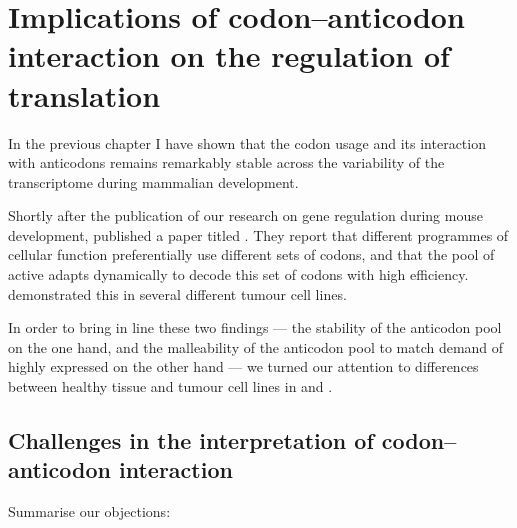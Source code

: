 \chapter{Implications of codon–anticodon interaction on the regulation of translation}

In the previous chapter I have shown that the codon usage and its interaction
with \trna anticodons remains remarkably stable across the variability of the
transcriptome during mammalian development.

Shortly after the publication of our research on \trna gene regulation during
mouse development, \citet{Gingold:2014} published a paper titled . They report that different programmes of cellular function
preferentially use different sets of codons, and that the pool of active
\trna[s] adapts dynamically to decode this set of codons with high efficiency.
\citet{Gingold:2014} demonstrated this in several different tumour cell lines.

In order to bring in line these two findings — the stability of the anticodon
pool on the one hand, and the malleability of the anticodon pool to match demand
of highly expressed on the other hand — we turned our attention to differences
between healthy tissue and tumour cell lines in \mmu and \hsa.


\section{Challenges in the interpretation of codon–anticodon interaction}

Summarise our objections:

